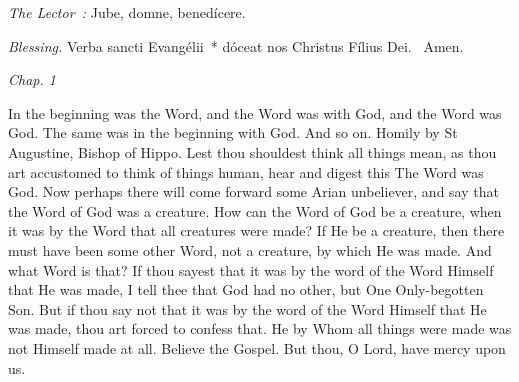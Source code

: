 {{  }

  {
    \medskip

    \emph{The Lector~:} Jube, domne, benedícere.

    \emph{Blessing.} Verba sancti Evangélii~* dóceat nos Christus Fílius Dei. \Rbar{}~Amen.
  }

  \bigskip{}
  {


  }

  {
    \hspace{10ex}{Lesson IX.}\hfill\emph{Chap. 1}\hspace{10ex}

    \begin{parcolumns}[rulebetween,colwidths={1=.51\linewidth}]{2}
    {In the beginning was the Word, and the Word was with God, and the Word was God. The same was in the beginning with God. And so on.
Homily by St Augustine, Bishop of Hippo.
Lest thou shouldest think all things mean, as thou art accustomed to think of things human, hear and digest this The Word was God. Now perhaps there will come forward some Arian unbeliever, and say that the Word of God was a creature. How can the Word of God be a creature, when it was by the Word that all creatures were made? If He be a creature, then there must have been some other Word, not a creature, by which He was made. And what Word is that? If thou sayest that it was by the word of the Word Himself that He was made, I tell thee that God had no other, but One Only-begotten Son. But if thou say not that it was by the word of the Word Himself that He was made, thou art forced to confess that. He by Whom all things were made was not Himself made at all. Believe the Gospel.
      But thou, O Lord, have mercy upon us.}
    \end{parcolumns}

}}

